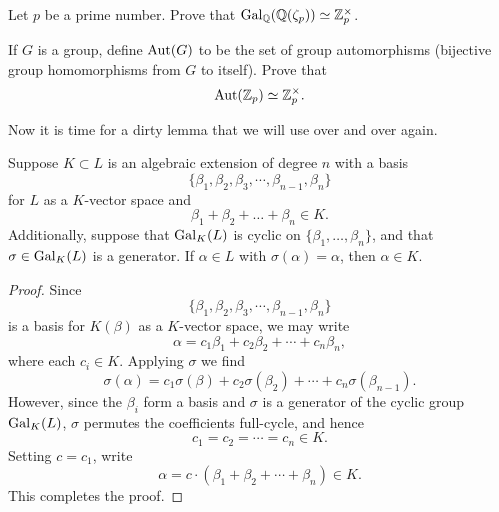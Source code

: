 \documentclass{ximera}
\begin{document}
\begin{exercise}
  Let $p$ be a prime number. Prove that $\operatorname{Gal}_\mathbb Q(\mathbb Q(\zeta_p))\simeq
  \mathbb Z_p^\times$.
\end{exercise}

\begin{exercise}
  If $G$ is a group, define $\operatorname{Aut}(G)$ to be the set of group
  automorphisms (bijective group homomorphisms from $G$ to
  itself). Prove that
  \[
  \operatorname{Aut}(\mathbb Z_p) \simeq \mathbb Z_p^\times.
  \]
\end{exercise}



Now it is time for a dirty lemma that we will use over and over again.


\begin{lemma}\label{L:fgf}
  Suppose $K\subset L$ is an algebraic extension of degree $n$
  with a basis
  \[
  \{\beta_1,\beta_2,\beta_3,\cdots,\beta_{n-1},\beta_n\}
  \]
  for $L$ as a $K$-vector space and
  \[
  \beta_1 + \beta_2 + \dots + \beta_n \in K.
  \]
  Additionally, suppose that $\operatorname{Gal}_{K}(L)$ is cyclic on
  $\{\beta_1,\dots,\beta_n\}$, and that $\sigma\in\operatorname{Gal}_{K}(L)$ is a
  generator. If $\alpha\in L$ with $\sigma(\alpha) = \alpha$, then
  $\alpha\in K$.
  \begin{proof}
    Since
    \[
    \{\beta_1,\beta_2,\beta_3,\cdots,\beta_{n-1},\beta_n\}
    \]
    is a basis for $K(\beta)$ as a $K$-vector space, we may  write
    \[
    \alpha = c_1 \beta_1 + c_2 \beta_2 + \cdots + c_n\beta_{n},
    \]
    where each $c_i\in K$. Applying $\sigma$ we find
    \[
    \sigma(\alpha) = c_1 \sigma(\beta) + c_2 \sigma(\beta_2) + \cdots + c_n\sigma(\beta_{n-1}).
    \]
    However, since the $\beta_i$ form a basis and $\sigma$ is a
    generator of the cyclic group $\operatorname{Gal}_{K}(L)$, $\sigma$
    permutes the coefficients full-cycle, and hence
    \[
    c_1 = c_2 = \cdots = c_{n}\in K.
    \]
    Setting $c= c_1$, write
    \[
    \alpha = c \cdot (\beta_1 + \beta_2 + \cdots + \beta_{n}) \in K.
    \]
    This completes the proof.
  \end{proof}
\end{lemma}
\end{document}
